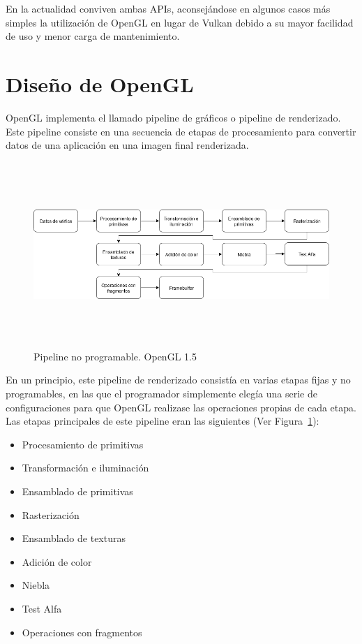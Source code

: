 En la actualidad conviven ambas APIs, aconsejándose en algunos casos más
simples la utilización de OpenGL en lugar de Vulkan debido a su mayor facilidad
de uso y menor carga de mantenimiento.

\section{Diseño de OpenGL}
\label{makereference2.3}

OpenGL implementa el llamado pipeline de gráficos o pipeline de renderizado.
Este pipeline consiste en una secuencia de etapas de procesamiento para
convertir datos de una aplicación en una imagen final renderizada. 

\begin{figure}[h]
		\centering
		\includegraphics[height=7cm,width=\textwidth]{figures/pipelinefijo.png}
		\caption{Pipeline no programable. OpenGL 1.5}
		\label{fig2.1}
\end{figure}

En un principio, este pipeline de renderizado consistía en varias etapas fijas y
no programables, en las que el programador simplemente elegía una serie de
configuraciones para que OpenGL realizase las operaciones propias de cada etapa.
Las etapas principales de este pipeline eran las siguientes (Ver
Figura~\ref{fig2.1}):

\begin{itemize}
		\item Procesamiento de primitivas
		\item Transformación e iluminación
		\item Ensamblado de primitivas
		\item Rasterización
		\item Ensamblado de texturas
		\item Adición de color
		\item Niebla
		\item Test Alfa
		\item Operaciones con fragmentos
\end{itemize}

